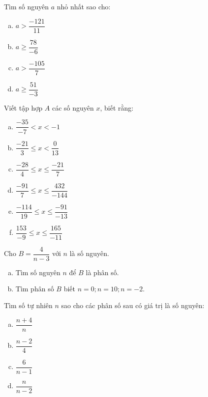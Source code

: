 \begin{bt}
\end{bt}   \begin{bt}
Tìm số nguyên $a$ nhỏ nhất sao cho:
\begin{multicols}{2}
\begin{enumerate}[a)]
\item $a > \dfrac{-121}{11}$
\item $a \geq \dfrac{78}{-6}$
\item $a > \dfrac{-105}{7}$
\item $a \geq \dfrac{51}{-3}$
\end{enumerate}
\end{multicols}
 
\end{bt}   \begin{bt}
Viết tập hợp $A$ các số nguyên $x$, biết rằng:
\begin{multicols}{2}
\begin{enumerate}[a)]
\item  $\dfrac{-35}{-7} <x < -1$
\item  $\dfrac{-21}{3}\leq x < \dfrac{0}{13}$
\item  $\dfrac{-28}{4} \leq x \leq \dfrac{-21}{7}$
\item $\dfrac{-91}{7} \leq x \leq \dfrac{432}{-144}$
\item  $\dfrac{-114}{19} \leq x \leq \dfrac{-91}{-13}$
\item $\dfrac{153}{-9} \leq x \leq \dfrac{ 165}{-11}$
\end{enumerate} 
\end{multicols}


\end{bt}   \begin{bt}
Cho $B =\dfrac{4}{n-3}$ với $n$ là số nguyên.
\begin{enumerate}[a)]
\item Tìm số nguyên $n$ để $B$ là phân số.
\item Tìm phân số $B$ biết $n=0; n =10; n=-2.$
\end{enumerate}


\end{bt}   \begin{bt}
Tìm số tự nhiên $n$ sao cho các phân số sau có giá trị là số nguyên:
\begin{multicols}{2}
\begin{enumerate}[a)]
\item $\dfrac{n+4}{n}$
\item $\dfrac{n-2}{4}$  
\item $\dfrac{6}{n-1}$   
\item $\dfrac{n}{n-2}$  
\end{enumerate}
\end{multicols}

\end{bt} 